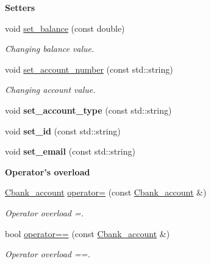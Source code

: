 \begin{Indent}{\bf Setters}\par
\begin{DoxyCompactItemize}
\item 
void \hyperlink{class_cbank__account_ab47bf4fce0d38963c39ce893553b951f}{set\+\_\+balance} (const double)
\begin{DoxyCompactList}\small\item\em Changing balance value. \end{DoxyCompactList}\item 
void \hyperlink{class_cbank__account_a920a324760772b2018fe4a4812a8eeca}{set\+\_\+account\+\_\+number} (const std\+::string)
\begin{DoxyCompactList}\small\item\em Changing account value. \end{DoxyCompactList}\item 
\hypertarget{class_cbank__account_ad067a6adcf86c952dbea0c5618f2a75d}{void {\bfseries set\+\_\+account\+\_\+type} (const std\+::string)}\label{class_cbank__account_ad067a6adcf86c952dbea0c5618f2a75d}

\item 
\hypertarget{class_cbank__account_ac1391a73f13e372d70f58c32580387c9}{void {\bfseries set\+\_\+id} (const std\+::string)}\label{class_cbank__account_ac1391a73f13e372d70f58c32580387c9}

\item 
\hypertarget{class_cbank__account_ad4497b266e17580934d1e3bd8bcb09f7}{void {\bfseries set\+\_\+email} (const std\+::string)}\label{class_cbank__account_ad4497b266e17580934d1e3bd8bcb09f7}

\end{DoxyCompactItemize}
\end{Indent}
\begin{Indent}{\bf Operator's overload}\par
\begin{DoxyCompactItemize}
\item 
\hyperlink{class_cbank__account}{Cbank\+\_\+account} \hyperlink{class_cbank__account_ad7e7000d9b3ee72d662c2408e4e56690}{operator=} (const \hyperlink{class_cbank__account}{Cbank\+\_\+account} \&)
\begin{DoxyCompactList}\small\item\em Operator overload =. \end{DoxyCompactList}\item 
bool \hyperlink{class_cbank__account_afea50b53cab83d40a3c33e9b4fb80bf1}{operator==} (const \hyperlink{class_cbank__account}{Cbank\+\_\+account} \&)
\begin{DoxyCompactList}\small\item\em Operator overload ==. \end{DoxyCompactList}\end{DoxyCompactItemize}
\end{Indent}


